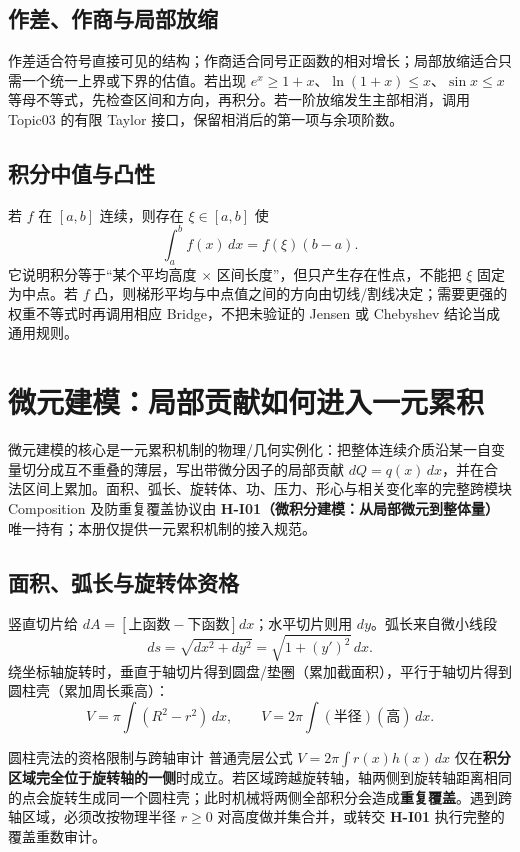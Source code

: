 \documentclass[11pt,a4paper,fontset=fandol]{ctexart}
\newcommand{\kw}[1]{\textbf{\color{deep}#1}}
\begin{document}
\subsection{作差、作商与局部放缩}

作差适合符号直接可见的结构；作商适合同号正函数的相对增长；局部放缩适合只需一个统一上界或下界的估值。若出现 $e^x\ge1+x$、$\ln(1+x)\le x$、$\sin x\le x$ 等母不等式，先检查区间和方向，再积分。若一阶放缩发生主部相消，调用 Topic03 的有限 Taylor 接口，保留相消后的第一项与余项阶数。

\subsection{积分中值与凸性}

若 $f$ 在 $[a,b]$ 连续，则存在 $\xi\in[a,b]$ 使
\[
\int_a^b{f(x)}\,dx=f(\xi)(b-a).
\]
它说明积分等于“某个平均高度 $\times$ 区间长度”，但只产生存在性点，不能把 $\xi$ 固定为中点。若 $f$ 凸，则梯形平均与中点值之间的方向由切线/割线决定；需要更强的权重不等式时再调用相应 Bridge，不把未验证的 Jensen 或 Chebyshev 结论当成通用规则。

\section{微元建模：局部贡献如何进入一元累积}

微元建模的核心是一元累积机制的物理/几何实例化：把整体连续介质沿某一自变量切分成互不重叠的薄层，写出带微分因子的局部贡献 $dQ=q(x)\,dx$，并在合法区间上累加。面积、弧长、旋转体、功、压力、形心与相关变化率的完整跨模块 Composition 及防重复覆盖协议由 \kw{H-I01（微积分建模：从局部微元到整体量）} 唯一持有；本册仅提供一元累积机制的接入规范。

\subsection{面积、弧长与旋转体资格}

竖直切片给 $dA=[\text{上函数}-\text{下函数}]dx$；水平切片则用 $dy$。弧长来自微小线段
\[
ds=\sqrt{dx^2+dy^2}=\sqrt{1+{(y')}^2}\,dx.
\]
绕坐标轴旋转时，垂直于轴切片得到圆盘/垫圈（累加截面积），平行于轴切片得到圆柱壳（累加周长乘高）：
\[
V=\pi\int(R^2-r^2)\,dx,
\qquad
V=2\pi\int(\text{半径})(\text{高})\,dx.
\]

\begin{warnbox}{圆柱壳法的资格限制与跨轴审计}
普通壳层公式 $V=2\pi\int r(x)h(x)\,dx$ 仅在\textbf{积分区域完全位于旋转轴的一侧}时成立。若区域跨越旋转轴，轴两侧到旋转轴距离相同的点会旋转生成同一个圆柱壳；此时机械将两侧全部积分会造成\textbf{重复覆盖}。遇到跨轴区域，必须改按物理半径 $r\ge0$ 对高度做并集合并，或转交 \kw{H-I01} 执行完整的覆盖重数审计。
\end{warnbox}
\end{document}
